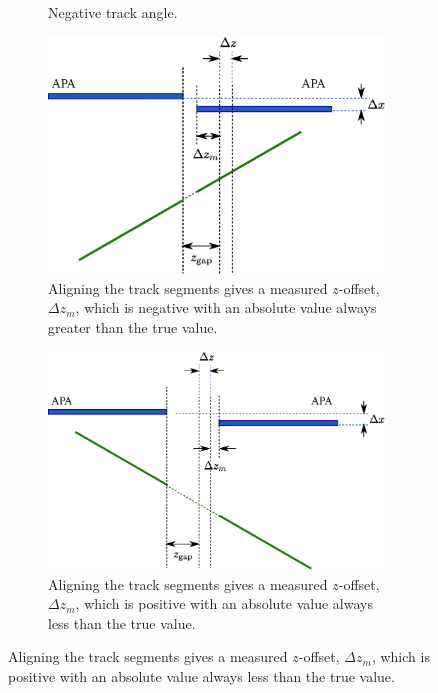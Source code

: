 \begin{figure}
\begin{subfigure}[t]{0.48\linewidth}
    \caption{Negative track angle.}
    \label{fig:APAGapXOffsetZOffsetNeg}
  \end{subfigure}
  \vfill
  \begin{subfigure}[t]{0.48\linewidth}
    \centering
    \includegraphics[width=0.98\textwidth]{apa_gap_xoffset_zoffset_pos_fix.eps}
    \caption{Aligning the track segments gives a measured $z$-offset, $\Delta z_m$, which is negative with an absolute value always greater than the true value.}
    \label{fig:APAGapXOffsetZOffsetPosFix}
  \end{subfigure}
  \hfill
  \begin{subfigure}[t]{0.48\linewidth}
    \centering
    \includegraphics[width=0.98\textwidth]{apa_gap_xoffset_zoffset_neg_fix.eps}
    \caption{Aligning the track segments gives a measured $z$-offset, $\Delta z_m$, which is positive with an absolute value always less than the true value.}
    \label{fig:APAGapXOffsetZOffsetNegFix}

\end{subfigure}
\end{figure}
